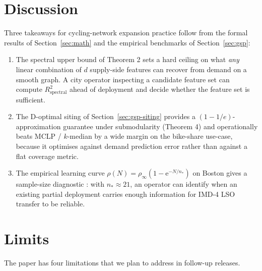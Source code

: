 \documentclass[11pt,a4paper]{article}
\newcommand{\1}{\mathbb{1}}
\theoremstyle{plain}
\theoremstyle{definition}
\theoremstyle{remark}
\begin{document}



\section{Discussion}
\label{sec:discussion}

Three takeaways for cycling-network expansion practice follow
from the formal results of Section~\ref{sec:math} and the
empirical benchmarks of Section~\ref{sec:gsp}:

\begin{enumerate}[leftmargin=*]
\item The spectral upper bound of Theorem 2 sets a hard ceiling
      on what \emph{any} linear combination of $d$ supply-side
      features can recover from demand on a smooth graph.  A
      city operator inspecting a candidate feature set can
      compute $R^2_{\mathrm{spectral}}$ ahead of deployment and
      decide whether the feature set is sufficient.
\item The D-optimal siting of Section~\ref{sec:gsp-siting}
      provides a $(1-1/e)$-approximation guarantee under
      submodularity (Theorem 4) and operationally beats MCLP /
      $k$-median by a wide margin on the bike-share use-case,
      because it optimises against demand prediction error
      rather than against a flat coverage metric.
\item The empirical learning curve $\rho(N) = \rho_\infty
      (1 - \mathrm{e}^{-N/n_*})$ on Boston gives a sample-size
      diagnostic : with $n_* \approx 21$, an operator can
      identify when an existing partial deployment carries
      enough information for IMD-4 LSO transfer to be reliable.
\end{enumerate}

\section{Limits}
\label{sec:limits}

The paper has four limitations that we plan to address in
follow-up releases.
\end{document}
